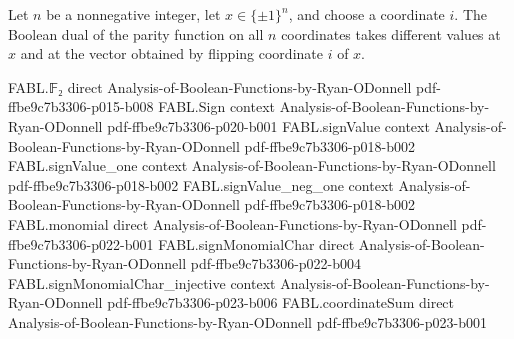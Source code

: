 \begin{theorem}
\label{FABL.booleanDual_parityFunction_univ_isPivotal}
\leanok
{}
Let $n$ be a nonnegative integer, let $x\in\{\pm1\}^n$, and choose a coordinate $i$. The
Boolean dual of the parity function on all $n$ coordinates takes different values at $x$
and at the vector obtained by flipping coordinate $i$ of $x$.
\end{theorem}

\begin{theorem}
\label{FABL.DNFFormula.term_width_eq_dimension_of_computes_booleanDual_parity}
\leanok
{}
\proofstep
  {FABL.𝔽₂}
  {direct}
  {Analysis-of-Boolean-Functions-by-Ryan-ODonnell}
  {pdf-ffbe9c7b3306-p015-b008}
\proofstep
  {FABL.Sign}
  {context}
  {Analysis-of-Boolean-Functions-by-Ryan-ODonnell}
  {pdf-ffbe9c7b3306-p020-b001}
\proofstep
  {FABL.signValue}
  {context}
  {Analysis-of-Boolean-Functions-by-Ryan-ODonnell}
  {pdf-ffbe9c7b3306-p018-b002}
\proofstep
  {FABL.signValue_one}
  {context}
  {Analysis-of-Boolean-Functions-by-Ryan-ODonnell}
  {pdf-ffbe9c7b3306-p018-b002}
\proofstep
  {FABL.signValue_neg_one}
  {context}
  {Analysis-of-Boolean-Functions-by-Ryan-ODonnell}
  {pdf-ffbe9c7b3306-p018-b002}
\proofstep
  {FABL.monomial}
  {direct}
  {Analysis-of-Boolean-Functions-by-Ryan-ODonnell}
  {pdf-ffbe9c7b3306-p022-b001}
\proofstep
  {FABL.signMonomialChar}
  {direct}
  {Analysis-of-Boolean-Functions-by-Ryan-ODonnell}
  {pdf-ffbe9c7b3306-p022-b004}
\proofstep
  {FABL.signMonomialChar_injective}
  {context}
  {Analysis-of-Boolean-Functions-by-Ryan-ODonnell}
  {pdf-ffbe9c7b3306-p023-b006}
\proofstep
  {FABL.coordinateSum}
  {direct}
  {Analysis-of-Boolean-Functions-by-Ryan-ODonnell}
  {pdf-ffbe9c7b3306-p023-b001}
\proofstep

\end{theorem}
